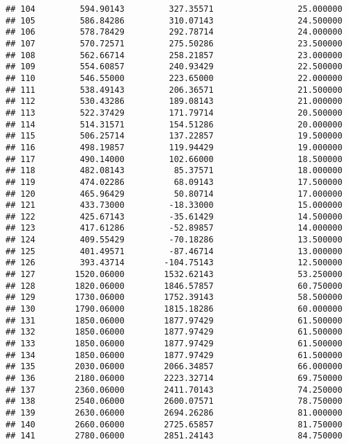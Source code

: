 \documentclass[]{article}
\begin{document}
\begin{verbatim}
## 104         594.90143         327.35571                 25.000000
## 105         586.84286         310.07143                 24.500000
## 106         578.78429         292.78714                 24.000000
## 107         570.72571         275.50286                 23.500000
## 108         562.66714         258.21857                 23.000000
## 109         554.60857         240.93429                 22.500000
## 110         546.55000         223.65000                 22.000000
## 111         538.49143         206.36571                 21.500000
## 112         530.43286         189.08143                 21.000000
## 113         522.37429         171.79714                 20.500000
## 114         514.31571         154.51286                 20.000000
## 115         506.25714         137.22857                 19.500000
## 116         498.19857         119.94429                 19.000000
## 117         490.14000         102.66000                 18.500000
## 118         482.08143          85.37571                 18.000000
## 119         474.02286          68.09143                 17.500000
## 120         465.96429          50.80714                 17.000000
## 121         433.73000         -18.33000                 15.000000
## 122         425.67143         -35.61429                 14.500000
## 123         417.61286         -52.89857                 14.000000
## 124         409.55429         -70.18286                 13.500000
## 125         401.49571         -87.46714                 13.000000
## 126         393.43714        -104.75143                 12.500000
## 127        1520.06000        1532.62143                 53.250000
## 128        1820.06000        1846.57857                 60.750000
## 129        1730.06000        1752.39143                 58.500000
## 130        1790.06000        1815.18286                 60.000000
## 131        1850.06000        1877.97429                 61.500000
## 132        1850.06000        1877.97429                 61.500000
## 133        1850.06000        1877.97429                 61.500000
## 134        1850.06000        1877.97429                 61.500000
## 135        2030.06000        2066.34857                 66.000000
## 136        2180.06000        2223.32714                 69.750000
## 137        2360.06000        2411.70143                 74.250000
## 138        2540.06000        2600.07571                 78.750000
## 139        2630.06000        2694.26286                 81.000000
## 140        2660.06000        2725.65857                 81.750000
## 141        2780.06000        2851.24143                 84.750000

\end{verbatim}
\end{document}
